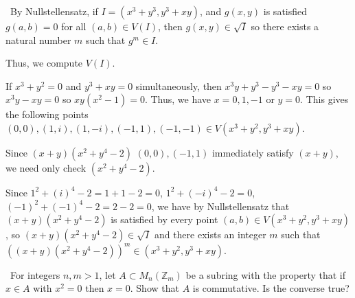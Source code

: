 \documentclass[12pt]{AlgebraQual}
\begin{document}
\begin{solution}$\,$
By Nullstellensatz, if $I=(x^3+y^3,y^3+xy)$, and $g(x,y)$ is satisfied $g(a,b)=0$ for all $(a,b)\in V(I)$, then $g(x,y)\in\sqrt{I}$ so there exists a natural number $m$ such that $g^m\in I.$

Thus, we compute $V(I).$

If $x^3+y^2=0$ and $y^3+xy=0$ simultaneously, then $x^3y+y^3-y^3-xy=0$ so $x^3y-xy=0$ so $xy(x^2-1)=0$. Thus, we have $x=0,1,-1$ or $y=0$. This gives the following points $(0,0),(1,i),(1,-i),(-1,1),(-1,-1)\in V(x^3+y^2,y^3+xy)$.

Since $(x+y)(x^2+y^4-2)$ $(0,0),(-1,1)$ immediately satisfy $(x+y)$, we need only check $(x^2+y^4-2)$.

Since $1^2+(i)^4-2=1+1-2=0$, $1^2+(-i)^4-2=0$, $(-1)^2+(-1)^4-2=2-2=0$, we have by Nullstellensatz that $(x+y)(x^2+y^4-2)$ is satisfied by every point $(a,b)\in V(x^3+y^2,y^3+xy)$, so $(x+y)(x^2+y^4-2)\in\sqrt{I}$ and there exists an integer $m$ such that $((x+y)(x^2+y^4-2))^m\in(x^3+y^2,y^3+xy)$.
\end{solution}
\newpage


\begin{problem} $\,$
For integers $n,m>1$, let $A\subset M_n(\mathbb{Z}_m)$ be a subring with the property that if $x\in A$ with $x^2=0$ then $x=0.$ Show that $A$ is commutative. Is the converse true?
\end{problem}
\end{document}
